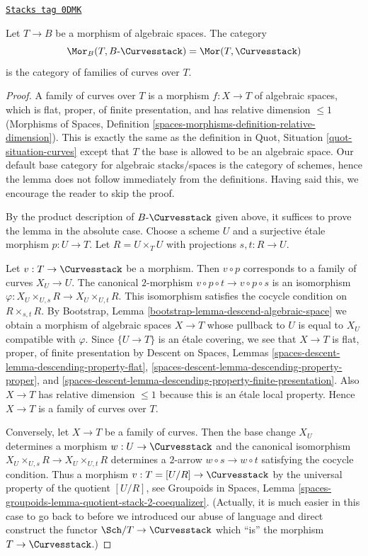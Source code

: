 \begin{lemma}
\label{moduli-curves-lemma-extend-curves-to-spaces}
\href{https://stacks.math.columbia.edu/tag/0DMK}{\texttt{Stacks tag 0DMK}}

Let $T \to B$ be a morphism of algebraic spaces. The category
$$
\Mor_B(T, B\text{-}\Curvesstack) = \Mor(T, \Curvesstack)
$$
is the category of families of curves over $T$.
\end{lemma}

\begin{proof}
A family of curves over $T$ is a morphism $f : X \to T$ of algebraic
spaces, which is flat, proper, of finite presentation, and has
relative dimension $\leq 1$ (Morphisms of Spaces, Definition
\ref{spaces-morphisms-definition-relative-dimension}).
This is exactly the same as the definition in
Quot, Situation \ref{quot-situation-curves}
except that $T$ the base is allowed to be an algebraic space.
Our default base category for algebraic stacks/spaces
is the category of schemes, hence the lemma does not follow
immediately from the definitions. Having said this, we encourage
the reader to skip the proof.

\medskip\noindent
By the product description of $B\text{-}\Curvesstack$ given above,
it suffices to prove the lemma in the absolute case. Choose a scheme
$U$ and a surjective \'etale morphism $p : U \to T$.
Let $R = U \times_T U$ with projections $s, t : R \to U$.

\medskip\noindent
Let $v : T \to \Curvesstack$ be a morphism. Then $v \circ p$
corresponds to a family of curves $X_U \to U$. The canonical
$2$-morphism $v \circ p \circ t \to v \circ p \circ s$
is an isomorphism $\varphi : X_U \times_{U, s} R \to X_U \times_{U, t} R$.
This isomorphism satisfies the cocycle condition on
$R \times_{s, t} R$.
By Bootstrap, Lemma \ref{bootstrap-lemma-descend-algebraic-space}
we obtain a morphism of algebraic spaces $X \to T$
whose pullback to $U$ is equal to $X_U$ compatible with $\varphi$.
Since $\{U \to T\}$ is an \'etale covering, we see that
$X \to T$ is flat, proper, of finite presentation by
Descent on Spaces, Lemmas
\ref{spaces-descent-lemma-descending-property-flat},
\ref{spaces-descent-lemma-descending-property-proper}, and
\ref{spaces-descent-lemma-descending-property-finite-presentation}.
Also $X \to T$ has relative dimension $\leq 1$ because this is
an \'etale local property. Hence $X \to T$ is a family of curves over $T$.

\medskip\noindent
Conversely, let $X \to T$ be a family of curves. Then the
base change $X_U$ determines a morphism $w : U \to \Curvesstack$
and the canonical isomorphism $X_U \times_{U, s} R \to X_U \times_{U, t} R$
determines a $2$-arrow $w \circ s \to w \circ t$ satisfying the
cocycle condition. Thus a morphism $v : T = [U/R] \to \Curvesstack$
by the universal property of the quotient $[U/R]$, see
Groupoids in Spaces, Lemma
\ref{spaces-groupoids-lemma-quotient-stack-2-coequalizer}.
(Actually, it is much easier in this case to go back to before
we introduced our abuse of language and direct construct
the functor $\Sch/T \to \Curvesstack$ which ``is'' the
morphism $T \to \Curvesstack$.)


\end{proof}
